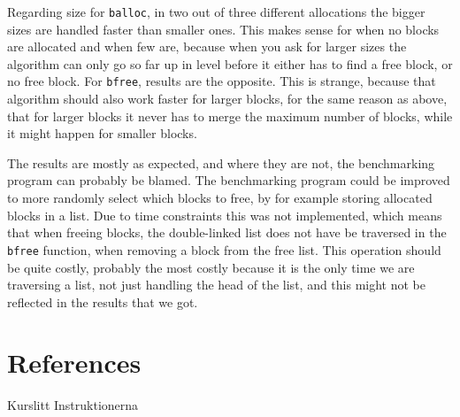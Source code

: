 \documentclass{article}
\def\code#1{\texttt{#1}}
\begin{document}
Regarding size for \code{balloc}, in two out of three different allocations the bigger sizes are handled faster than smaller ones. This makes sense for when no blocks are allocated and when few are, because when you ask for larger sizes the algorithm can only go so far up in level before it either has to find a free block, or no free block. For \code{bfree}, results are the opposite. This is strange, because that algorithm should also work faster for larger blocks, for the same reason as above, that for larger blocks it never has to merge the maximum number of blocks, while it might happen for smaller blocks.

The results are mostly as expected, and where they are not, the benchmarking program can probably be blamed. The benchmarking program could be improved to more randomly select which blocks to free, by for example storing allocated blocks in a list. Due to time constraints this was not implemented, which means that when freeing blocks, the double-linked list does not have be traversed in the \code{bfree} function, when removing a block from the free list. This operation should be quite costly, probably the most costly because it is the only time we are traversing a list, not just handling the head of the list, and this might not be reflected in the results that we got.

\section{References}

Kurslitt
Instruktionerna
\end{document}
